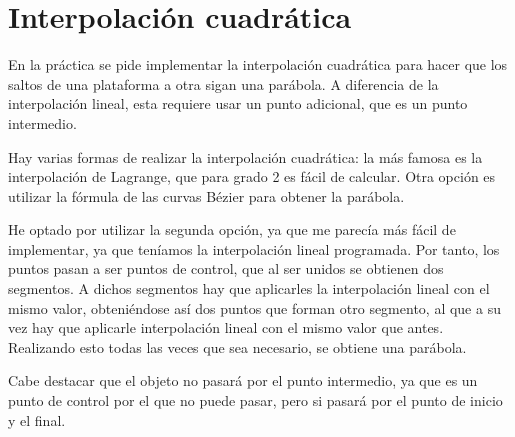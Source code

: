 \section{Interpolación cuadrática}

En la práctica se pide implementar la interpolación cuadrática para hacer que los saltos de una plataforma a otra sigan una parábola. A diferencia de la interpolación lineal, esta requiere usar un punto adicional, que es un punto intermedio.

\bigskip

Hay varias formas de realizar la interpolación cuadrática: la más famosa es la interpolación de Lagrange, que para grado 2 es fácil de calcular. Otra opción es utilizar la fórmula de las curvas Bézier para obtener la parábola.

\bigskip

He optado por utilizar la segunda opción, ya que me parecía más fácil de implementar, ya que teníamos la interpolación lineal programada. Por tanto, los puntos pasan a ser puntos de control, que al ser unidos se obtienen dos segmentos. A dichos segmentos hay que aplicarles la interpolación lineal con el mismo valor, obteniéndose así dos puntos que forman otro segmento, al que a su vez hay que aplicarle interpolación lineal con el mismo valor que antes. Realizando esto todas las veces que sea necesario, se obtiene una parábola.

\bigskip

Cabe destacar que el objeto no pasará por el punto intermedio, ya que es un punto de control por el que no puede pasar, pero si pasará por el punto de inicio y el final.

